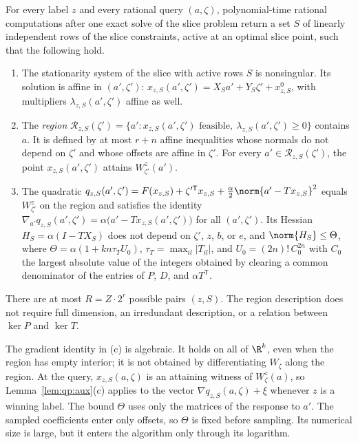 \begin{lemma}\label{lem:qp:pieces}
For every label $z$ and every rational query $(a,\zeta)$, polynomial-time
rational computations after one exact solve of the slice problem return a
set $S$ of linearly independent rows of the slice constraints, active at an
optimal slice point, such that the following hold.
\begin{enumerate}[label=(\alph*)]
\item The stationarity system of the slice with active rows $S$ is
 nonsingular. Its solution is affine in $(a',\zeta')$:
 $x_{z,S}(a',\zeta')=X_Sa'+Y_S\zeta'+x^0_{z,S}$, with multipliers
 $\lambda_{z,S}(a',\zeta')$ affine as well.
\item The \emph{region}
 $\mathcal R_{z,S}(\zeta')=\{a':x_{z,S}(a',\zeta')\text{ feasible},\
 \lambda_{z,S}(a',\zeta')\ge0\}$ contains $a$. It is defined by at most $r+n$
 affine inequalities whose normals do not depend on $\zeta'$ and whose
 offsets are affine in $\zeta'$. For every $a'\in\mathcal R_{z,S}(\zeta')$,
 the point $x_{z,S}(a',\zeta')$ attains $W^z_{\zeta'}(a')$.
\item The quadratic
 $q_{z,S}(a',\zeta')=F(x_{z,S})+\zeta'^{\mathsf T} x_{z,S}+\frac\alpha2\norm{a'-Tx_{z,S}}^2$
 equals $W^z_{\zeta'}$ on the region and satisfies the identity
 $\nabla_{a'}q_{z,S}(a',\zeta')=\alpha\bigl(a'-Tx_{z,S}(a',\zeta')\bigr)$ for
 all $(a',\zeta')$. Its Hessian $H_S=\alpha(I-TX_S)$ does not depend on
 $\zeta'$, $z$, $b$, or $e$, and $\norm{H_S}\le\Theta$, where
 $\Theta=\alpha(1+kn\tau_TU_0)$, $\tau_T=\max_{il}|T_{il}|$, and
 $U_0=(2n)!\,C_0^{2n}$ with $C_0$ the largest absolute value of the integers
 obtained by clearing a common denominator of the entries of $P$, $D$, and
 $\alpha T^{\mathsf T}$.
\end{enumerate}
There are at most $R=Z\cdot2^r$ possible pairs $(z,S)$. The region
description does not require full dimension, an irredundant description, or
a relation between $\ker P$ and $\ker T$.
\end{lemma}

The gradient identity in (c) is algebraic. It holds on all of $\R^k$, even
when the region has empty interior; it is not obtained by differentiating
$W_\zeta$ along the region. At the query, $x_{z,S}(a,\zeta)$ is an attaining
witness of $W^z_\zeta(a)$, so Lemma~\ref{lem:qp:aux}(c) applies to the
vector $\nabla q_{z,S}(a,\zeta)+\xi$ whenever $z$ is a winning label. The bound
$\Theta$ uses only the matrices of the response to $a'$. The sampled
coefficients enter only offsets, so $\Theta$ is fixed before sampling. Its
numerical size is large, but it enters the algorithm only through its
logarithm.

